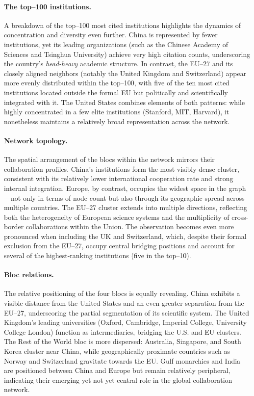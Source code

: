 \documentclass{article}
\begin{document}
\paragraph{The top--100 institutions.} 
A breakdown of the top--100 most cited institutions highlights the dynamics of concentration and diversity even further. China is represented by fewer institutions, yet its leading organizations (such as the Chinese Academy of Sciences and Tsinghua University) achieve very high citation counts, underscoring the country’s \textit{head-heavy} academic structure. In contrast, the EU--27 and its closely aligned neighbors (notably the United Kingdom and Switzerland) appear more evenly distributed within the top--100, with five of the ten most cited institutions located outside the formal EU but politically and scientifically integrated with it. The United States combines elements of both patterns: while highly concentrated in a few elite institutions (Stanford, MIT, Harvard), it nonetheless maintains a relatively broad representation across the network.

\paragraph{Network topology.} 
The spatial arrangement of the blocs within the network mirrors their collaboration profiles. China’s institutions form the most visibly dense cluster, consistent with its relatively lower international cooperation rate and strong internal integration. Europe, by contrast, occupies the widest space in the graph---not only in terms of node count but also through its geographic spread across multiple countries. The EU--27 cluster extends into multiple directions, reflecting both the heterogeneity of European science systems and the multiplicity of cross-border collaborations within the Union. The observation becomes even more pronounced when including the UK and Switzerland, which, despite their formal exclusion from the EU--27, occupy central bridging positions and account for several of the highest-ranking institutions (five in the top--10).

\paragraph{Bloc relations.} 
The relative positioning of the four blocs is equally revealing. China exhibits a visible distance from the United States and an even greater separation from the EU--27, underscoring the partial segmentation of its scientific system. The United Kingdom’s leading universities (Oxford, Cambridge, Imperial College, University College London) function as intermediaries, bridging the U.S. and EU clusters. The Rest of the World bloc is more dispersed: Australia, Singapore, and South Korea cluster near China, while geographically proximate countries such as Norway and Switzerland gravitate towards the EU. Gulf monarchies and India are positioned between China and Europe but remain relatively peripheral, indicating their emerging yet not yet central role in the global collaboration network.
\end{document}
